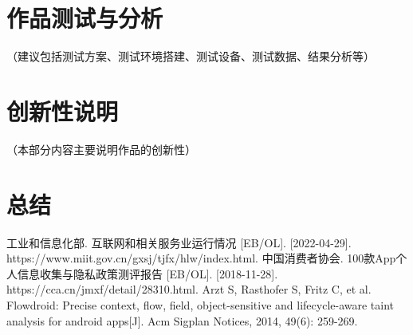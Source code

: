 \documentclass{cumcmthesis}
\numberwithin{equation}{section} %
\numberwithin{figure}{section} %
\numberwithin{table}{section} %
\begin{document}
\newpage

\section{作品测试与分析}

（建议包括测试方案、测试环境搭建、测试设备、测试数据、结果分析等）


\newpage

\section{创新性说明}

（本部分内容主要说明作品的创新性）

\newpage

\section{总结}

\newpage

\begin{thebibliography}{9}%
	\setlength{\itemsep}{-1mm}  %
	
	工业和信息化部. 互联网和相关服务业运行情况 [EB/OL]. [2022-04-29]. https://www.miit.gov.cn/gxsj/tjfx/hlw/index.html.
    中国消费者协会. 100款App个人信息收集与隐私政策测评报告 [EB/OL]. [2018-11-28]. https://cca.cn/jmxf/detail/28310.html.
    Arzt S, Rasthofer S, Fritz C, et al. Flowdroid: Precise context, flow, field, object-sensitive and lifecycle-aware taint analysis for android apps[J]. Acm Sigplan Notices, 2014, 49(6): 259-269.
\end{thebibliography}
\end{document}

